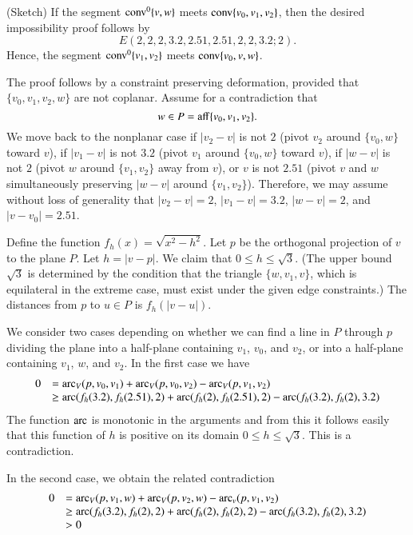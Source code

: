 \begin{tarskidata}
\begin{tarski}
\begin{proved} (Sketch)
If the segment ${\operatorname{conv}}^0\{v,w\}$ meets ${\operatorname{conv}}\{v_0,v_1,v_2\}$,
then the desired impossibility proof follows by
   $$
   E(2,2,2,  3.2,2.51,2.51,  2,2, 3.2; 2).
   $$
Hence, the segment ${\operatorname{conv}}^0\{v_1,v_2\}$ 
meets ${\operatorname{conv}}\{v_0,v,w\}$.

The proof
follows by a constraint preserving deformation, 
provided that $\{v_0,v_1,v_2,w\}$
are not coplanar. Assume for a contradiction that 
   $$
   w\in P={\operatorname{aff}}\{v_0,v_1,v_2\}.
   $$ 
We move back to the nonplanar case if
$|v_2-v|$ is not $2$ (pivot $v_2$ around $\{v_0,w\}$ toward $v$), if
$|v_1-v|$ is not $3.2$ (pivot $v_1$ around $\{v_0,w\}$ toward $v$), if
$|w-v|$ is not $2$ (pivot $w$ around $\{v_1,v_2\}$ away from $v$),
or $v$ is not $2.51$ (pivot $v$ and $w$ simultaneously preserving
$|w-v|$ around $\{v_1,v_2\}$).  Therefore, we may assume without
loss of generality that $|v_2-v|=2$, $|v_1-v|=3.2$, $|w-v|=2$, and
$|v-v_0|=2.51$.

Define the function $f_h(x)=\sqrt{x^2-h^2}$.
Let $p$ be the orthogonal projection of $v$ to the plane $P$.  Let
$h=|v-p|$. We claim that $0\le h \le\sqrt3$.
(The upper bound
$\sqrt3$ is determined by the condition that the triangle
$\{w,v_1,v\}$, which is equilateral in the extreme case, must exist under
the given edge constraints.)
The distances from $p$ to $u\in P$ is
$f_h(|v-u|)$. 

We consider two cases depending
on whether we can find a line in $P$ through $p$ dividing the
plane into a half-plane containing $v_1$, $v_0$, and $v_2$, or into
a half-plane containing $v_1$, $w$, and $v_2$.  In the first case
we have
 $$
\begin{array}{lll}
    0&=\operatorname{arc}_V(p,v_0,v_1)+
    \operatorname{arc}_V(p,v_0,v_2)- \operatorname{arc}_V(p,v_1,v_2)\\
    &\ge \operatorname{arc}(f_h(3.2),f_h(2.51),2)+
    \operatorname{arc}(f_h(2),f_h(2.51),2)-\operatorname{arc}(f_h(3.2),f_h(2),3.2)
\end{array}
 $$
The function $\operatorname{arc}$ is monotonic in the arguments and from this it
follows easily that this function of $h$ is positive on its domain
$0\le h\le \sqrt3$. This is a contradiction.  

In the second case, we obtain the
related contradiction
  $$
\begin{array}{lll}
    0&=\operatorname{arc}_V(p,v_1,w)+
    \operatorname{arc}_V(p,v_2,w)-
    \operatorname{arc}_v(p,v_1,v_2)\\
    &\ge \operatorname{arc}(f_h(3.2),f_h(2),2)+
    \operatorname{arc}(f_h(2),f_h(2),2)-\operatorname{arc}(f_h(3.2),f_h(2),3.2)\\
    &>0
\end{array}
  $$
\swallowed\end{proved}
\end{tarski}






\end{tarskidata}
